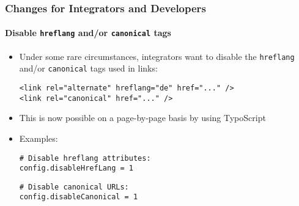 %

\begin{frame}[fragile]
	\frametitle{Changes for Integrators and Developers}
	\framesubtitle{Disable \texttt{hreflang} and/or \texttt{canonical} tags}


	\begin{itemize}
		\item Under some rare circumstances, integrators want to disable the
			\texttt{hreflang} and/or \texttt{canonical} tags used in links:
\begin{lstlisting}
<link rel="alternate" hreflang="de" href="..." />
<link rel="canonical" href="..." />
\end{lstlisting}
		\item This is now possible on a page-by-page basis by using TypoScript
		\item Examples:
\begin{lstlisting}
# Disable hreflang attributes:
config.disableHrefLang = 1
\end{lstlisting}
\vspace{-0.2cm}
\begin{lstlisting}
# Disable canonical URLs:
config.disableCanonical = 1
\end{lstlisting}
	\end{itemize}

\end{frame}

